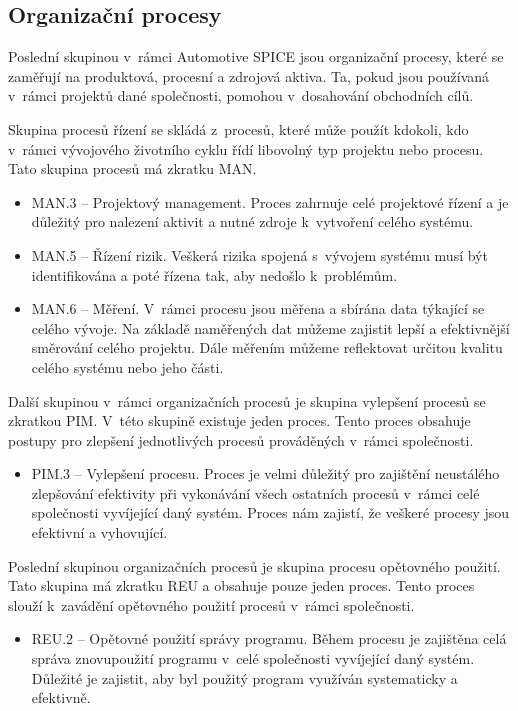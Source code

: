\documentclass[czech,master]{diploma}
\begin{document}
\subsection{Organizační procesy}
Poslední skupinou v~rámci Automotive SPICE jsou organizační procesy, které se zaměřují na produktová, procesní a zdrojová aktiva. Ta, pokud jsou používaná v~rámci projektů dané společnosti, pomohou v~dosahování obchodních cílů.

Skupina procesů řízení se skládá z~procesů, které může použít kdokoli, kdo v~rámci vývojového životního cyklu řídí libovolný typ projektu nebo procesu. Tato skupina procesů má zkratku MAN.

\begin{itemize}
\item MAN.3 -- Projektový management. Proces zahrnuje celé projektové řízení a je důležitý pro nalezení aktivit a nutné zdroje k~vytvoření celého systému.
\item MAN.5 -- Řízení rizik. Veškerá rizika spojená s~vývojem systému musí být identifikována a poté řízena tak, aby nedošlo k~problémům.
\item MAN.6 -- Měření. V~rámci procesu jsou měřena a sbírána data týkající se celého vývoje. Na základě naměřených dat můžeme zajistit lepší a efektivnější směrování celého projektu. Dále měřením můžeme reflektovat určitou kvalitu celého systému nebo jeho části.
\end{itemize}

Další skupinou v~rámci organizačních procesů je skupina vylepšení procesů se zkratkou PIM. V~této skupině existuje jeden proces. Tento proces obsahuje postupy pro zlepšení jednotlivých procesů prováděných v~rámci společnosti.

\begin{itemize}
\item PIM.3 -- Vylepšení procesu. Proces je velmi důležitý pro zajištění neustálého zlepšování efektivity při vykonávání všech ostatních procesů v~rámci celé společnosti vyvíjející daný systém. Proces nám zajistí, že veškeré procesy jsou efektivní a vyhovující.
\end{itemize}

Poslední skupinou organizačních procesů je skupina procesu opětovného použití. Tato skupina má zkratku REU a obsahuje pouze jeden proces. Tento proces slouží k~zavádění opětovného použití procesů v~rámci společnosti.

\begin{itemize}
\item REU.2 -- Opětovné použití správy programu. Během procesu je zajištěna celá správa znovupoužití programu v~celé společnosti vyvíjející daný systém. Důležité je zajistit, aby byl použitý program využíván systematicky a efektivně.
\end{itemize}
\end{document}
